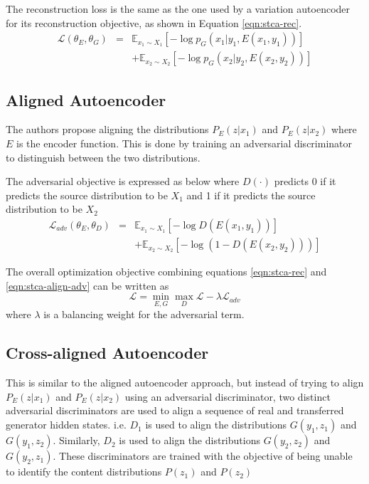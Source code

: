 The reconstruction loss is the same as the one used by a variation autoencoder for its reconstruction objective, as shown in Equation \ref{eqn:stca-rec}.
\begin{eqnarray} \label{eqn:stca-rec}
	\mathcal{L}(\theta_E,\theta_G)
	&=& \mathbb{E}_{x_1 \sim X_1}[-\log p_G(x_1|y_1,E(x_1, y_1))] \nonumber \\
	& & + \mathbb{E}_{x_2 \sim X_2}[-\log p_G(x_2|y_2,E(x_2, y_2))]
\end{eqnarray}

\subsection{Aligned Autoencoder}

The authors propose aligning the distributions $P_E(z|x_1)$ and $P_E(z|x_2)$ where $E$ is the encoder function. This is done by training an adversarial discriminator to distinguish between the two distributions.

The adversarial objective is expressed as below where $D(\cdot)$ predicts 0 if it predicts the source distribution to be $X_1$ and 1 if it predicts the source distribution to be $X_2$
\begin{eqnarray} \label{eqn:stca-align-adv}
	\mathcal{L}_{adv}(\theta_E,\theta_D)
	&=& \mathbb{E}_{x_1 \sim X_1}[-\log D(E(x_1,y_1))] \nonumber \\
	& & + \mathbb{E}_{x_2 \sim X_2}[-\log(1 - D(E(x_2,y_2)))]
\end{eqnarray}

The overall optimization objective combining equations \ref{eqn:stca-rec} and \ref{eqn:stca-align-adv} can be written as
\begin{equation}
	\mathcal{L} = \operatorname*{min}_{E,G} \operatorname*{max}_{D} \mathcal{L} - \lambda \mathcal{L}_{adv}
\end{equation}
where $\lambda$ is a balancing weight for the adversarial term.

\subsection{Cross-aligned Autoencoder}

This is similar to the aligned autoencoder approach, but instead of trying to align $P_E(z|x_1)$ and $P_E(z|x_2)$ using an adversarial discriminator, two distinct adversarial discriminators are used to align a sequence of real and transferred generator hidden states. i.e. $D_1$ is used to align the distributions $G(y_1, z_1)$ and $G(y_1, z_2)$. Similarly, $D_2$ is used to align the distributions $G(y_2, z_2)$ and $G(y_2, z_1)$. These discriminators are trained with the objective of being unable to identify the content distributions $P(z_1)$ and $P(z_2)$

